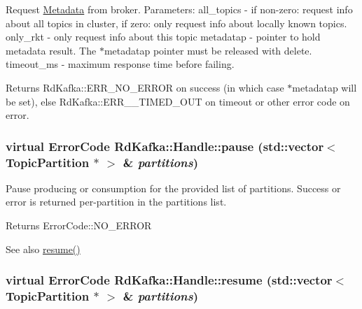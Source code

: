 Request \hyperlink{classRdKafka_1_1Metadata}{Metadata} from broker. Parameters: {\ttfamily all\_\-topics} -\/ if non-\/zero: request info about all topics in cluster, if zero: only request info about locally known topics. {\ttfamily only\_\-rkt} -\/ only request info about this topic {\ttfamily metadatap} -\/ pointer to hold metadata result. The {\ttfamily $\ast$metadatap} pointer must be released with {\ttfamily delete}. {\ttfamily timeout\_\-ms} -\/ maximum response time before failing.

\begin{DoxyReturn}{Returns}
RdKafka::ERR\_\-NO\_\-ERROR on success (in which case {\ttfamily $\ast$metadatap} will be set), else RdKafka::ERR\_\-\_\-TIMED\_\-OUT on timeout or other error code on error. 
\end{DoxyReturn}
\hypertarget{classRdKafka_1_1Handle_a6be6579b7e2a0427b4595fb559e58d0f}{
\subsubsection[{pause}]{\setlength{\rightskip}{0pt plus 5cm}virtual ErrorCode RdKafka::Handle::pause (std::vector$<$ {\bf TopicPartition} $\ast$ $>$ \& {\em partitions})}}
\label{classRdKafka_1_1Handle_a6be6579b7e2a0427b4595fb559e58d0f}


Pause producing or consumption for the provided list of partitions. Success or error is returned per-\/partition in the {\ttfamily partitions} list.

\begin{DoxyReturn}{Returns}
ErrorCode::NO\_\-ERROR
\end{DoxyReturn}
\begin{DoxySeeAlso}{See also}
\hyperlink{classRdKafka_1_1Handle_a322d16d6786da2b4b20505f19325fcec}{resume()} 
\end{DoxySeeAlso}
\hypertarget{classRdKafka_1_1Handle_a322d16d6786da2b4b20505f19325fcec}{
\subsubsection[{resume}]{\setlength{\rightskip}{0pt plus 5cm}virtual ErrorCode RdKafka::Handle::resume (std::vector$<$ {\bf TopicPartition} $\ast$ $>$ \& {\em partitions})}}
\label{classRdKafka_1_1Handle_a322d16d6786da2b4b20505f19325fcec}


